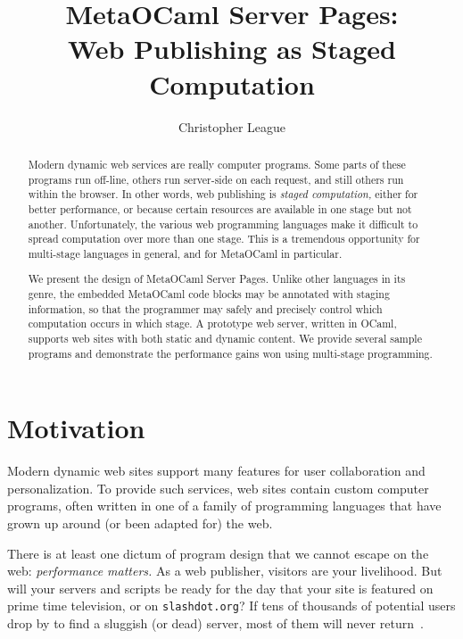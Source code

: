 \documentclass{elsart}
\def\MOC{MetaOCaml\xspace}
\begin{document}
\begin{frontmatter}
\title{\MOC Server Pages:\\Web Publishing as Staged Computation}
\author{Christopher League}
\address{Long Island University \textperiodcentered{} Computer Science\\
  1 University Plaza \textperiodcentered{} Brooklyn, NY 11201\\
  \textup{\texttt{christopher.league@liu.edu}}}

\begin{abstract}
  Modern dynamic web services are really computer programs.  Some
  parts of these programs run off-line, others run server-side on each
  request, and still others run within the browser.  In other words,
  web publishing is \emph{staged computation,} either for better
  performance, or because certain resources are available in one stage
  but not another.  Unfortunately, the various web programming
  languages make it difficult to spread computation over more than one
  stage.  This is a tremendous opportunity for multi-stage languages
  in general, and for \MOC in particular.
  
  We present the design of \MOC Server Pages.  Unlike other languages
  in its genre, the embedded \MOC code blocks may be annotated with
  staging information, so that the programmer may safely and precisely
  control which computation occurs in which stage.  A prototype web
  server, written in OCaml, supports web sites with both static and
  dynamic content.  We provide several sample programs and demonstrate
  the performance gains won using multi-stage programming.
\end{abstract}
\end{frontmatter}


\section{Motivation}
\label{sec:intro}
Modern dynamic web sites support many features for user collaboration
and personalization.  To provide such services, web sites contain
custom computer programs, often written in one of a family of
programming languages that have grown up around (or been adapted for)
the web.

There is at least one dictum of program design that we cannot escape
on the web: \emph{performance matters.}  As a web publisher, visitors
are your livelihood.  But will your servers and scripts be ready for
the day that your site is featured on prime time television, or on
\texttt{slashdot.org}?  If tens of thousands of potential users drop
by to find a sluggish (or dead) server, most of them will never
return~\cite{greenspun99panda}.
\end{document}
